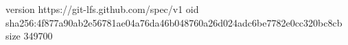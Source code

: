 version https://git-lfs.github.com/spec/v1
oid sha256:4f877a90ab2e56781ae04a76da46b048760a26d024adc6be7782e0cc320bc8cb
size 349700
